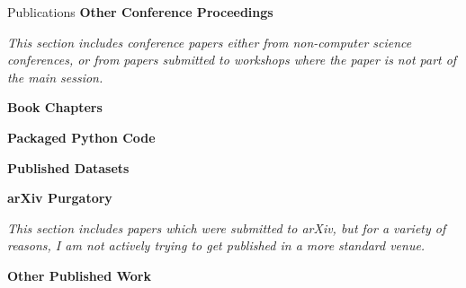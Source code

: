 \documentclass{resume} %
\begin{document}
\begin{rSection}{Publications}
\textbf{Other Conference Proceedings}

\textit{This section includes conference papers either from non-computer science conferences, or from papers submitted to workshops where the paper is not part of the main session.}

\printbibliography[keyword = conference, heading=none]

\textbf{Book Chapters}
\printbibliography[keyword = book, heading=none]

\textbf{Packaged Python Code}
\printbibliography[keyword = code, heading=none]


\textbf{Published Datasets}
\printbibliography[keyword = dataset, heading=none]

\textbf{arXiv Purgatory}

\textit{This section includes papers which were submitted to arXiv, but for a variety of reasons, I am not actively trying to get published in a more standard venue. }
\printbibliography[keyword = purgatory, heading=none]

\textbf{Other Published Work}
\printbibliography[keyword = other, heading=none]


%
% 
% 

%
\end{rSection}

%
\end{document}
